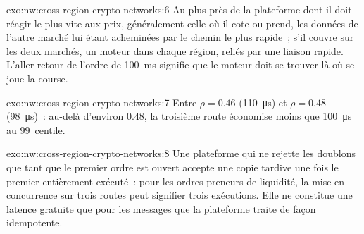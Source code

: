 \begin{solution}{exo:nw:cross-region-crypto-networks:6}
Au plus près de la plateforme dont il doit réagir le plus vite aux prix, généralement celle où il cote ou prend, les données de l'autre marché lui étant
acheminées par le chemin le plus rapide~; s'il couvre sur les deux marchés, un moteur dans chaque région, reliés par une liaison rapide. L'aller-retour de l'ordre de \qty{100}{\milli\second} signifie que le
moteur doit se trouver là où se joue la course.
\end{solution}

\begin{solution}{exo:nw:cross-region-crypto-networks:7}
Entre $\rho = 0.46$ (\qty{110}{\micro\second}) et $\rho = 0.48$ (\qty{98}{\micro\second})~: au-delà d'environ 0.48, la troisième route économise moins que
\qty{100}{\micro\second} au 99~centile.
\end{solution}

\begin{solution}{exo:nw:cross-region-crypto-networks:8}
Une plateforme qui ne rejette les doublons que tant que le premier ordre est ouvert accepte une copie tardive une fois le premier entièrement exécuté~: pour les ordres preneurs de liquidité, la mise en concurrence sur trois
routes peut signifier trois exécutions. Elle ne constitue une latence gratuite que pour les messages que la plateforme traite de façon idempotente.
\end{solution}

